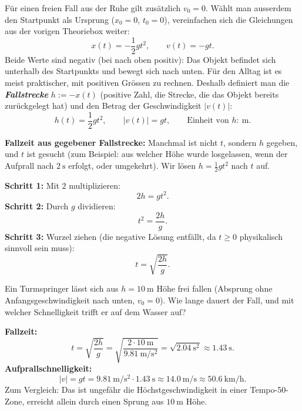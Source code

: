 \documentclass[addpoints,11pt,a4paper]{exam}
\begin{document}
\begin{theoriebox}
Für einen freien Fall aus der Ruhe gilt zusätzlich $v_0=0$. Wählt man
ausserdem den Startpunkt als Ursprung ($x_0=0$, $t_0=0$), vereinfachen
sich die Gleichungen aus der vorigen Theoriebox weiter:
\[
  x(t) = -\frac{1}{2}gt^2, \qquad v(t) = -gt.
\]
Beide Werte sind negativ (bei \glqq nach oben positiv\grqq{}): Das Objekt
befindet sich unterhalb des Startpunkts und bewegt sich nach unten. Für
den Alltag ist es meist praktischer, mit positiven Grössen zu rechnen.
Deshalb definiert man die \textbf{\emph{Fallstrecke}}
$h := -x(t)$ (positive Zahl, die Strecke, die das Objekt bereits
zurückgelegt hat) und den Betrag der Geschwindigkeit $\lvert v(t)\rvert$:
\[
  \boxed{h(t) = \frac{1}{2}gt^2}, \qquad \boxed{\lvert v(t)\rvert = gt},
  \qquad \text{Einheit von } h\colon\ \si{\meter}.
\]

\textbf{Fallzeit aus gegebener Fallstrecke:} Manchmal ist nicht $t$,
sondern $h$ gegeben, und $t$ ist gesucht (zum Beispiel: aus welcher Höhe
wurde losgelassen, wenn der Aufprall nach $\SI{2}{\second}$ erfolgt, oder
umgekehrt). Wir lösen $h=\tfrac{1}{2}gt^2$ nach $t$ auf.

\textbf{Schritt 1:} Mit $2$ multiplizieren:
\[
  2h = gt^2.
\]
\textbf{Schritt 2:} Durch $g$ dividieren:
\[
  t^2 = \frac{2h}{g}.
\]
\textbf{Schritt 3:} Wurzel ziehen (die negative Lösung entfällt, da
$t\geq0$ physikalisch sinnvoll sein muss):
\[
  \boxed{t = \sqrt{\frac{2h}{g}}}.
\]

\begin{beispielbox}
Ein Turmspringer lässt sich aus $h=\SI{10}{\meter}$ Höhe frei fallen
(Absprung ohne Anfangsgeschwindigkeit nach unten, $v_0=0$). Wie lange
dauert der Fall, und mit welcher Schnelligkeit trifft er auf dem
Wasser auf?

\textbf{Fallzeit:}
\[
  t = \sqrt{\frac{2h}{g}} = \sqrt{\frac{2\cdot\SI{10}{\meter}}{\SI{9.81}{\meter\per\second\squared}}}
  = \sqrt{\SI{2.04}{\second\squared}} \approx \SI{1.43}{\second}.
\]
\textbf{Aufprallschnelligkeit:}
\[
  \lvert v\rvert = gt = \SI{9.81}{\meter\per\second\squared}\cdot\SI{1.43}{\second} \approx \SI{14.0}{\meter\per\second} \approx \SI{50.6}{\kilo\meter\per\hour}.
\]
Zum Vergleich: Das ist ungefähr die Höchstgeschwindigkeit in einer
Tempo-50-Zone, erreicht allein durch einen Sprung aus $\SI{10}{\meter}$
Höhe.
\end{beispielbox}
\end{theoriebox}
\end{document}
